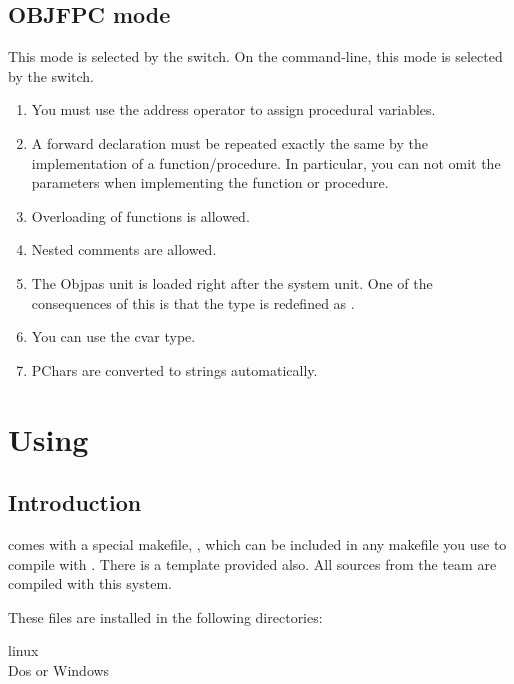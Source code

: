 \documentclass{report}
\begin{document}
\section{OBJFPC mode}
This mode is selected by the  switch. On the command-line,
this mode is selected by the  switch.
\begin{enumerate}
\item You must use the address operator to assign procedural variables.
\item A forward declaration must be repeated exactly the same by the
implementation of a function/procedure. In particular, you can not omit the
parameters when implementing the function or procedure.
\item Overloading of functions is allowed.
\item Nested comments are allowed.
\item The Objpas unit is loaded right after the system unit. One of the
consequences of this is that the type  is redefined as
.
\item You can use the cvar type.
\item PChars are converted to strings automatically.
\end{enumerate}


\chapter{Using }
\label{ch:makefile}
\newcommand{\mvar}[1]{\var{\$(#1)}}

\section{Introduction}
\fpc comes with a special makefile, , which can be 
included in any makefile you use to compile with \fpc. There is a template
 provided also. All sources from the \fpc team are compiled
with this system.

These files are installed in the following directories:
\begin{description}
\item[linux]
\item[Dos or Windows]
\end{description}
\end{document}
